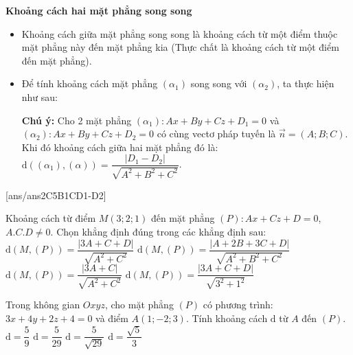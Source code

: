 \textbf{Khoảng cách hai mặt phẳng song song}
\begin{itemize}
\item Khoảng cách giữa mặt phẳng song song là khoảng cách từ một điểm thuộc mặt phẳng này đến mặt phẳng kia (Thực chất là khoảng cách từ một điểm đến mặt phẳng).
\item Để tính khoảng cách mặt phẳng $(\alpha_1)$ song song với $(\alpha_2)$, ta thực hiện như sau:
\textbf{Chú ý:} Cho 2 mặt phẳng $(\alpha_1)\colon Ax+By+Cz+D_1=0$ và $(\alpha_2)\colon Ax+By+Cz+D_2=0$ có cùng vectơ pháp tuyến là $\vec{n}=(A;B;C)$.\\
Khi đó khoảng cách giữa hai mặt phẳng đó là: $\mathrm{d}((\alpha_1),(\alpha))=\dfrac{|D_1-D_2|}{\sqrt{A^2+B^2+C^2}}$.
\end{itemize}
\TN
{}[ans/ans2C5B1CD1-D2]
\begin{ex}%
	Khoảng cách từ điểm $M\left(3;2;1\right)$ đến mặt phẳng $(P)\colon Ax+Cz+D=0$, $A.C.D\ne 0$. Chọn khẳng định đúng trong các khẳng định sau:
\choice
{\True $\mathrm{d}(M,(P))=\dfrac{\left| 3A+C+D\right|}{\sqrt{A^2+C^2}}$}
{$\mathrm{d}(M,(P))=\dfrac{\left| A+2B+3C+D\right|}{\sqrt{A^2+B^2+C^2}}$}
{$\mathrm{d}(M,(P))=\dfrac{\left| 3A+C\right|}{\sqrt{A^2+C^2}}$}
{$\mathrm{d}(M,(P))=\dfrac{\left| 3A+C+D\right|}{\sqrt{3^2+1^2}}$}
\end{ex}

\begin{ex}%
	Trong không gian $Oxyz$, cho mặt phẳng $(P)$ có phương trình: $3x+4y+2z+4=0$ và điểm $A(1;-2;3)$. Tính khoảng cách $\mathrm{d}$ từ $A$ đến $(P)$.
\choice
{$\mathrm{d}=\dfrac{5}{9}$}
{$\mathrm{d}=\dfrac{5}{29}$}
{\True $\mathrm{d}=\dfrac{5}{\sqrt{29}}$}
{$\mathrm{d}=\dfrac{\sqrt{5}}{3}$}
\end{ex}


